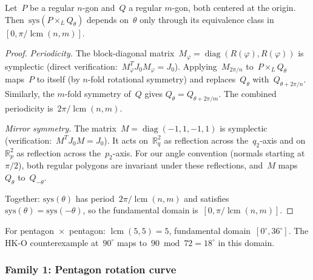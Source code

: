 \begin{lemma}
\label{lem:rotation-fundamental-domain}
Let~$P$ be a regular $n$-gon and~$Q$ a regular $m$-gon, both centered at the
origin. Then~$\mathrm{sys}(P \times_L Q_\theta)$ depends on~$\theta$ only
through its equivalence class in~$[0, \pi/\operatorname{lcm}(n,m)]$.
\end{lemma}

\begin{proof}
\emph{Periodicity.}
The block-diagonal matrix~$M_\varphi = \operatorname{diag}(R(\varphi),
R(\varphi))$ is symplectic (direct verification:~$M_\varphi^T J_0 M_\varphi
= J_0$). Applying~$M_{2\pi/n}$ to~$P \times_L Q_\theta$ maps~$P$ to itself
(by $n$-fold rotational symmetry) and replaces~$Q_\theta$
with~$Q_{\theta + 2\pi/n}$. Similarly, the $m$-fold symmetry of~$Q$ gives
$Q_\theta = Q_{\theta + 2\pi/m}$. The combined periodicity
is~$2\pi/\operatorname{lcm}(n,m)$.

\emph{Mirror symmetry.}
The matrix~$M = \operatorname{diag}(-1, 1, -1, 1)$ is symplectic
(verification:~$M^T J_0 M = J_0$). It acts on~$\mathbb{R}^2_q$ as reflection
across the~$q_2$-axis and on~$\mathbb{R}^2_p$ as reflection across
the~$p_2$-axis. For our angle convention (normals starting at~$\pi/2$), both
regular polygons are invariant under these reflections, and~$M$
maps~$Q_\theta$ to~$Q_{-\theta}$.

Together: $\mathrm{sys}(\theta)$ has period~$2\pi/\operatorname{lcm}(n,m)$ and
satisfies~$\mathrm{sys}(\theta) = \mathrm{sys}(-\theta)$, so the fundamental
domain is~$[0, \pi/\operatorname{lcm}(n,m)]$.
\end{proof}

\begin{remark}
For pentagon~$\times$~pentagon:
$\operatorname{lcm}(5,5)=5$, fundamental
domain~$[0^\circ, 36^\circ]$. The HK-O counterexample at~$90^\circ$
maps to~$90 \bmod 72 = 18^\circ$ in this domain.
\end{remark}


\subsubsection*{Family 1: Pentagon rotation curve}

